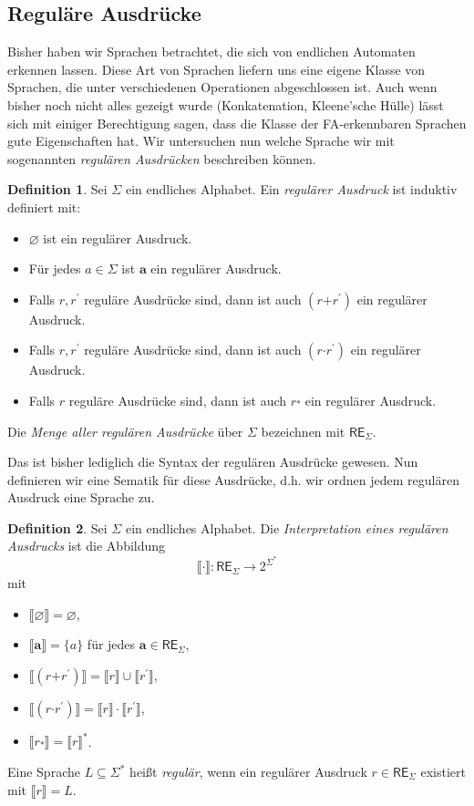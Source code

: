\documentclass[11pt, a4paper]{article}
\theoremstyle{definition}
\newtheorem{definition}{Definition}[section]
\theoremstyle{plain}
\numberwithin{equation}{section}
\let\emptyset\varnothing
\begin{document}
\subsection{Reguläre Ausdrücke}\label{sec:regular_regexp}
Bisher haben wir Sprachen betrachtet, die sich von endlichen Automaten erkennen lassen. Diese Art von Sprachen liefern uns eine eigene Klasse von Sprachen, die unter verschiedenen Operationen abgeschlossen ist. Auch wenn bisher noch nicht alles gezeigt wurde (Konkatenation, Kleene'sche Hülle) lässt sich mit einiger Berechtigung sagen, dass die Klasse der FA-erkennbaren Sprachen gute Eigenschaften hat. Wir untersuchen nun welche Sprache wir mit sogenannten \textit{regulären Ausdrücken} beschreiben können.
\begin{definition}\label{def:regexsyntax}
	Sei $\Sigma$ ein endliches Alphabet. Ein \textit{regulärer Ausdruck} ist induktiv definiert mit:
	\begin{itemize}
		\item $\bm{\emptyset}$ ist ein regulärer Ausdruck.
		\item Für jedes $a \in \Sigma$ ist $\bm{a}$ ein regulärer Ausdruck.
		\item Falls $r, r^\prime$ reguläre Ausdrücke sind, dann ist auch $(r \bm{+} r^\prime)$ ein regulärer Ausdruck.
		\item Falls $r, r^\prime$ reguläre Ausdrücke sind, dann ist auch $(r \bm{\cdot} r^\prime)$ ein regulärer Ausdruck.
		\item Falls $r$ reguläre Ausdrücke sind, dann ist auch $r \overset{\bm{\ast}}{}$ ein regulärer Ausdruck.
	\end{itemize}
	Die \textit{Menge aller regulären Ausdrücke} über $\Sigma$ bezeichnen mit $\mathsf{RE}_\Sigma$.
\end{definition}
Das ist bisher lediglich die Syntax der regulären Ausdrücke gewesen. Nun definieren wir eine Sematik für diese Ausdrücke, d.h. wir ordnen jedem regulären Ausdruck eine Sprache zu.
\begin{definition}
	Sei $\Sigma$ ein endliches Alphabet. Die \textit{Interpretation eines regulären Ausdrucks} ist die Abbildung
	$$
		\llbracket \cdot \rrbracket \colon \mathsf{RE}_\Sigma \to 2^{\Sigma^\ast}
	$$
	mit
	\begin{itemize}
		\item $\llbracket \bm{\emptyset} \rrbracket = \emptyset$,
		\item $\llbracket \bm{a} \rrbracket = \{ a \}$ für jedes $\bm{a} \in \mathsf{RE}_\Sigma$,
		\item $\llbracket (r \bm{+} r^\prime) \rrbracket = \llbracket r \rrbracket \cup \llbracket r^\prime \rrbracket$,
		\item $\llbracket (r \bm{\cdot} r^\prime) \rrbracket = \llbracket r \rrbracket \cdot \llbracket r^\prime \rrbracket$,
		\item $\llbracket r \overset{\bm{\ast}}{} \rrbracket = \llbracket r \rrbracket^\ast$.
	\end{itemize}
	Eine Sprache $L \subseteq \Sigma^\ast$ heißt \textit{regulär}, wenn ein regulärer Ausdruck $r \in \mathsf{RE}_\Sigma$ existiert mit $\llbracket r \rrbracket = L$.
\end{definition}
\end{document}
